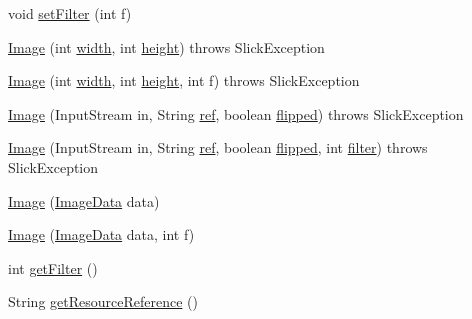 \begin{DoxyCompactItemize}
\item 
void \mbox{\hyperlink{classorg_1_1newdawn_1_1slick_1_1_image_aee3e0136fee0b045a3d95f3f6322722f}{set\+Filter}} (int f)
\item 
\mbox{\hyperlink{classorg_1_1newdawn_1_1slick_1_1_image_abcf4e3bfc122edb938f0d196bdc67d2a}{Image}} (int \mbox{\hyperlink{classorg_1_1newdawn_1_1slick_1_1_image_a7d02c85e21b388428cfe5cc5c82714a1}{width}}, int \mbox{\hyperlink{classorg_1_1newdawn_1_1slick_1_1_image_a54397a37823bc59ddc79ec70dc5cf226}{height}})  throws Slick\+Exception 
\item 
\mbox{\hyperlink{classorg_1_1newdawn_1_1slick_1_1_image_af16196c8ad97bf73bb1f126a5653ff30}{Image}} (int \mbox{\hyperlink{classorg_1_1newdawn_1_1slick_1_1_image_a7d02c85e21b388428cfe5cc5c82714a1}{width}}, int \mbox{\hyperlink{classorg_1_1newdawn_1_1slick_1_1_image_a54397a37823bc59ddc79ec70dc5cf226}{height}}, int f)  throws Slick\+Exception 
\item 
\mbox{\hyperlink{classorg_1_1newdawn_1_1slick_1_1_image_a1295aed103aae4b60eb8266e25c7b4e1}{Image}} (Input\+Stream in, String \mbox{\hyperlink{classorg_1_1newdawn_1_1slick_1_1_image_a32694687591a80299d8b8ad1ea070cee}{ref}}, boolean \mbox{\hyperlink{classorg_1_1newdawn_1_1slick_1_1_image_a45ebd330142d5ca956f6634158971ab0}{flipped}})  throws Slick\+Exception 
\item 
\mbox{\hyperlink{classorg_1_1newdawn_1_1slick_1_1_image_a094a794bbdb7ea3cdbba830a1d40d394}{Image}} (Input\+Stream in, String \mbox{\hyperlink{classorg_1_1newdawn_1_1slick_1_1_image_a32694687591a80299d8b8ad1ea070cee}{ref}}, boolean \mbox{\hyperlink{classorg_1_1newdawn_1_1slick_1_1_image_a45ebd330142d5ca956f6634158971ab0}{flipped}}, int \mbox{\hyperlink{classorg_1_1newdawn_1_1slick_1_1_image_a1c6f09687817420f3762f32bb1c3ed76}{filter}})  throws Slick\+Exception 
\item 
\mbox{\hyperlink{classorg_1_1newdawn_1_1slick_1_1_image_a939604bdc60e07135a425956b181f751}{Image}} (\mbox{\hyperlink{interfaceorg_1_1newdawn_1_1slick_1_1opengl_1_1_image_data}{Image\+Data}} data)
\item 
\mbox{\hyperlink{classorg_1_1newdawn_1_1slick_1_1_image_a0aa6cab817c15223c195aef4d6e3a68b}{Image}} (\mbox{\hyperlink{interfaceorg_1_1newdawn_1_1slick_1_1opengl_1_1_image_data}{Image\+Data}} data, int f)
\item 
int \mbox{\hyperlink{classorg_1_1newdawn_1_1slick_1_1_image_aa4940d459c41d613a9f51a685d9b5c44}{get\+Filter}} ()
\item 
String \mbox{\hyperlink{classorg_1_1newdawn_1_1slick_1_1_image_a2c02f07811aaf4a90bddc89d37e60ff8}{get\+Resource\+Reference}} ()

\end{DoxyCompactItemize}
